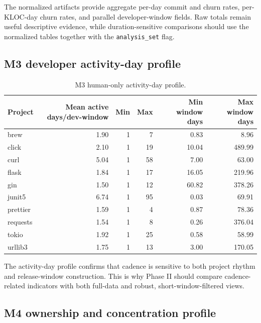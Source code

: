 The normalized artifacts provide aggregate per-day commit and churn rates, per-KLOC-day churn rates,
and parallel developer-window fields. Raw totals remain useful descriptive evidence, while duration-sensitive
comparisons should use the normalized tables together with the \texttt{analysis\_set} flag.

\subsection{M3 developer activity-day profile}
\label{sec:results_m3_activity}

\begin{table}[H]
\centering
\scriptsize
\renewcommand{\arraystretch}{1.12}
\begin{tabular}{lrrrrr}
\toprule
\textbf{Project} & \textbf{Mean active days/dev-window} & \textbf{Min} & \textbf{Max} & \textbf{Min window days} & \textbf{Max window days} \\
\midrule
brew     & 1.90 & 1 & 7  & 0.83 & 8.96   \\
click    & 2.10 & 1 & 19 & 10.04 & 489.99 \\
curl     & 5.04 & 1 & 58 & 7.00 & 63.00  \\
flask    & 1.84 & 1 & 17 & 16.05 & 219.96 \\
gin      & 1.50 & 1 & 12 & 60.82 & 378.26 \\
junit5   & 6.74 & 1 & 95 & 0.03 & 69.91  \\
prettier & 1.59 & 1 & 4  & 0.87 & 78.36  \\
requests & 1.54 & 1 & 8  & 0.26 & 376.04 \\
tokio    & 1.92 & 1 & 25 & 0.58 & 58.99  \\
urllib3  & 1.75 & 1 & 13 & 3.00 & 170.05 \\
\bottomrule
\end{tabular}
\caption[M3 human-only activity profile.]{M3 human-only activity-day profile.}
\label{tab:m3_activity_profile}
\end{table}

The activity-day profile confirms that cadence is sensitive to both project rhythm and release-window construction.
This is why Phase II should compare cadence-related indicators with both full-data and robust, short-window-filtered views.

\subsection{M4 ownership and concentration profile}
\label{sec:results_m4}


